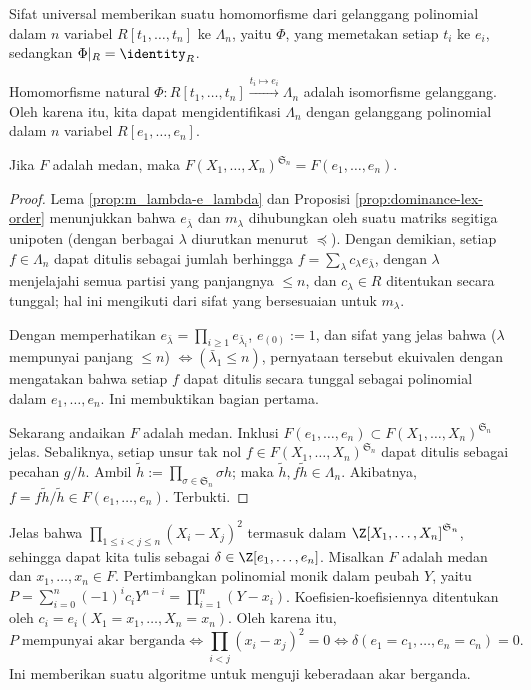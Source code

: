 Sifat universal memberikan suatu homomorfisme dari gelanggang polinomial dalam $n$ variabel $R[t_1, \ldots, t_n]$ ke $\Lambda_n$, yaitu $\Phi$, yang memetakan setiap $t_i$ ke $e_i$, sedangkan $\Phi|_R = \identity_R$.
\begin{theorem}\label{prop:fund-thm-symmetric-poly}
	Homomorfisme natural $\Phi: R[t_1, \ldots, t_n] \xrightarrow{t_i \mapsto e_i} \Lambda_n$ adalah isomorfisme gelanggang. Oleh karena itu, kita dapat mengidentifikasi $\Lambda_n$ dengan gelanggang polinomial dalam $n$ variabel $R[e_1, \ldots, e_n]$.
	
	Jika $F$ adalah medan, maka $F(X_1, \ldots, X_n)^{\mathfrak{S}_n} = F(e_1, \ldots, e_n)$.
\end{theorem}
\begin{proof}
	Lema \ref{prop:m_lambda-e_lambda} dan Proposisi \ref{prop:dominance-lex-order} menunjukkan bahwa $e_{\bar{\lambda}}$ dan $m_\lambda$ dihubungkan oleh suatu matriks segitiga unipoten (dengan berbagai $\lambda$ diurutkan menurut $\preceq$). Dengan demikian, setiap $f \in \Lambda_n$ dapat ditulis sebagai jumlah berhingga $f = \sum_\lambda c_\lambda e_{\bar{\lambda}}$, dengan $\lambda$ menjelajahi semua partisi yang panjangnya $\leq n$, dan $c_\lambda \in R$ ditentukan secara tunggal; hal ini mengikuti dari sifat yang bersesuaian untuk $m_\lambda$.
	
	Dengan memperhatikan $e_{\bar{\lambda}} = \prod_{i \geq 1} e_{\bar{\lambda}_i}$, $e_{(0)} := 1$, dan sifat yang jelas bahwa ($\lambda$ mempunyai panjang $\leq n$) $\iff (\bar{\lambda}_1 \leq n)$, pernyataan tersebut ekuivalen dengan mengatakan bahwa setiap $f$ dapat ditulis secara tunggal sebagai polinomial dalam $e_1, \ldots, e_n$. Ini membuktikan bagian pertama.
	
	Sekarang andaikan $F$ adalah medan. Inklusi $F(e_1, \ldots, e_n) \subset F(X_1, \ldots, X_n)^{\mathfrak{S}_n}$ jelas. Sebaliknya, setiap unsur tak nol $f \in F(X_1, \ldots, X_n)^{\mathfrak{S}_n}$ dapat ditulis sebagai pecahan $g/h$. Ambil $\tilde{h} := \prod_{\sigma \in \mathfrak{S}_n} \sigma h$; maka $\tilde{h}, f\tilde{h} \in \Lambda_n$. Akibatnya, $f = f\tilde{h}/\tilde{h} \in F(e_1, \ldots, e_n)$. Terbukti.
\end{proof}

\begin{example}[Diskriminan]\label{eg:polynomial-discriminant} 
	Jelas bahwa $\displaystyle\prod_{1 \leq i < j \leq n} (X_i - X_j)^2$ termasuk dalam $\Z[X_1, \ldots, X_n]^{\mathfrak{S}_n}$, sehingga dapat kita tulis sebagai $\delta \in \Z[e_1, \ldots, e_n]$. Misalkan $F$ adalah medan dan $x_1, \ldots, x_n \in F$. Pertimbangkan polinomial monik dalam peubah $Y$, yaitu $P = \sum_{i=0}^n (-1)^i c_i Y^{n-i} = \prod_{i=1}^n (Y - x_i)$. Koefisien-koefisiennya ditentukan oleh $c_i = e_i(X_1 = x_1, \ldots, X_n = x_n)$. Oleh karena itu,
	\[ P\; \text{mempunyai akar berganda} \iff \prod_{i < j} (x_i - x_j)^2 = 0 \iff \delta(e_1 = c_1, \ldots, e_n = c_n) = 0. \]
	Ini memberikan suatu algoritme untuk menguji keberadaan akar berganda.
\end{example}

